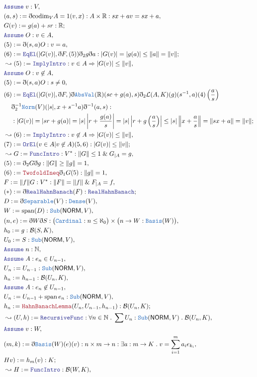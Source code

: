 \documentclass[12pt]{scrartcl}
\newcommand{\TYPE}[1]{\textcolor{NavyBlue}{\mathtt{#1}}}
\newcommand{\LOGIC}[1]{\textcolor{Blue}{\mathtt{#1}}}
\newcommand{\THM}[1]{\textcolor{Maroon}{\mathtt{#1}}}
\renewcommand{\.}{\; . \;}
\newcommand{\de}{: \kern 0.1pc =}
\newcommand{\NewLine}{\\ & \kern 1pc}
\newcommand{\Page}[1]{\begin{align*} #1 \end{align*} \newpage   }
\newcommand{ \bd }{ \ByDef }
\renewcommand{\And}{\; \& \;}
\newcommand{\Reals}{\mathbb{R} }
\newcommand{\Nat}{\mathbb{N} }
\newcommand{\Say}[3]{& #1 \de #2 : #3, \\}
\newcommand{\Conclude}[3]{& #1 \de #2 : #3; \\}
\newcommand{\Derive}[3]{& \leadsto #1 \de #2 : #3, \\}
\newcommand{\A}{\LOGIC{Assume} \;}
\newcommand{\Assume}[2]{& \A #1 : #2, \\}
\newcommand{\ByDef}{\eth}
\DeclareMathOperator{\Span}{span}
\newcommand{\NORM}{\textsf{NORM}}
\newcommand{\B}{\mathcal{B}}
\begin{document}
   \Page
   {
   \Assume{v}{V}
   \Say{(a,s)}{ \bd \mathrm{codim}_V  A = 1 (v, x) }{  A  \times \Reals : sx + a
      v = sx + a    
   }
   \Conclude{G(v)}{g(a) + sr}{\Reals}
   \Assume{O}{v \in A}
   \Say{(5)}{\bd (s,a)O }{ v = a}
   \Conclude{(6)}{ \LOGIC{EqEl}(|G(v)|, \bd F, (5))\bd_2 g \bd a }{| G(v)| = |g(a)| \le \| a \| = \| v \|}
   \Derive{(5)}{\LOGIC{ImplyIntro}}{ v \in A \Rightarrow |G(v)| \le \| v \| }
   \Assume{O}{ v \not \in A }
   \Say{(5)}{ \bd (s,a)O }{ s \neq 0 }
   \Conclude{(6)}{ \LOGIC{EqEl}(|G(v)|, \bd F, )\bd\TYPE{AbsVal}(\Reals)(sc + g(a),s)
     \bd_2 \mathcal{L}(A,K)(g)(s^{-1}, a)(4)\left( \frac{a}{s}  \right)
     \NewLine     
     \bd^{-1}_2 \TYPE{Norm}(V)(|s|,x + s^{-1}a)\bd^{-1} (a,s)   
     }{
    \NewLine :   
    | G(v) | = |sr  +  g(a)  | =  |s|\left|r + \frac{g(a)}{s} \right| 
   =  |s|\left|r + g \left( \frac{a}{s} \right) \right| \le  |s|\left\|  x   + \frac{a}{s}  \right\|
   = \left\| sx  + a \right\| = \| v \|
   }
   \Derive{(6)}{\LOGIC{ImplyIntro}}{ v \not \in A \Rightarrow |G(v)| \le \| v \| }
   \Conclude{(7)}{\LOGIC{OrEl}(v \in A | v \not \in A)(5,6)}{|G(v)| \le \| v \|}
   \Derive{G}{ \LOGIC{FuncIntro}}{  V^*  : \| G \| \le 1 \And G_{|A} = g }
   \Say{(5)}{\bd_2 G \bd g}{ \| G \| \ge \| g \| = 1 }
   \Say{(6)}{ \THM{TwofoldIneq}\bd_1 G  (5) }{ \| g \| = 1 }
   \Say{F}{\| f \|G}{ V^* : \| F \| = \| f \| \And  F_{|A} = f  }
   \Conclude{(*)}{\bd \LOGIC{RealHahnBanach}(F)}{\LOGIC{RealHahnBanach}}
   \Say{D}{\bd \TYPE{Separable}(V)}{\TYPE{Dense}(V)}
   \Say{W}{\Span(D)}{\TYPE{Sub}(\NORM,V)}
   \Say{(n,e)}{\bd W \bd S}{ \big(\TYPE{Cardinal} : n \le \aleph_0\big) \times \big(  n \to W 
    : \TYPE{Basis}(W)   
    \big)  }
   \Say{h_0}{g}{\B(S,K)}
   \Say{U_0}{S}{\TYPE{Sub}(\NORM,V)}
   \Assume{n}{\Nat}
   \Assume{A}{e_n \in U_{n - 1}}
   \Say{U_n}{U_{n - 1}}{\TYPE{Sub}(\NORM,V)}   
   \Say{h_n}{h_{n - 1}}{\B(U_n,K)}
   \Assume{A}{e_n \not \in U_{n - 1}}
   \Say{U_n}{U_{n -1} +  \Span{e_n}}{\TYPE{Sub}(\NORM,V)}
   \Conclude{h_n}{\THM{HahnBanachLemma}(U_n,U_{n-1},h_{n-1})}{\B(U_n,K)}
   \Derive{(U,h)}{ \LOGIC{RecursiveFunc}}{\forall n \in \Nat \. \sum U_n :
   \TYPE{Sub}(\NORM,V) \. \B(U_n,K)}
   \Assume{v}{W}
   \Say{(m,k)}{\bd \TYPE{Basis}(W)(e)(v)}{n \times m \to n : \exists a : m \to K \. v = \sum^m_{i = 1} a_i e_{k_i}}
   \Conclude{Hv)}{h_m(v)}{K}
   \Derive{H}{\LOGIC{FuncIntro}}{\B(W,K)}
   }
\end{document}
